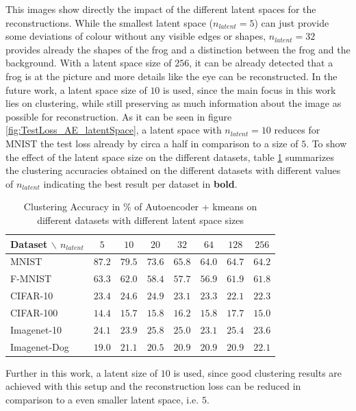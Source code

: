 \documentclass[12pt,DIV14,BCOR12mm,a4paper,footexclude,headinclude,halfparskip-,twoside,openright,cleardoubleempty,idxtotoc,bibtotoc,listtotoc]{scrreprt} %
\numberwithin{equation}{chapter}
\begin{document}
This images show directly the impact of the different latent spaces for the reconstructions. While the smallest latent space ($n_{latent}=5$) can just provide some deviations of colour without any visible edges or shapes, $n_{latent}=32$ provides already the shapes of the frog and a distinction between the frog and the background. With a latent space size of $256$, it can be already detected that a frog is at the picture and more details like the eye can be reconstructed.
In the future work, a latent space size of $10$ is used, since the main focus in this work lies on clustering, while still preserving as much information about the image as possible for reconstruction. As it can be seen in figure \ref{fig:TestLoss_AE_latentSpace}, a latent space with $n_{latent}=10$ reduces for MNIST the test loss already by circa a half in comparison to a size of $5$. To show the effect of the latent space size on the different datasets, table \ref{tab:ClusterACC_n_latent} summarizes the clustering accuracies obtained on the different datasets with different values of $n_{latent}$ indicating the best result per dataset in \textbf{bold}.
	\begin{table}[htb!]
    		\centering
    		\caption{Clustering Accuracy in \% of Autoencoder + kmeans on different datasets with different latent space sizes}
    		\label{tab:ClusterACC_n_latent}
    		\begin{tabular}{l|ccccccc}
        		Dataset $\backslash$ $n_{latent}$ & $5$ & $10$ & $20$ & $32$ & $64$ & $128$ & $256$\\ \hline
        		MNIST & $\mathbf{87.2}$ & $79.5$ & $73.6$ & $65.8$ & $64.0$ & $64.7$ & $64.2$\\
        		F-MNIST & $\mathbf{63.3}$ & $62.0$ & $58.4$ & $57.7$ & $56.9$ & $61.9$ & $61.8$\\
        		CIFAR-10 & $23.4$ & $24.6$ & $\mathbf{24.9}$ & $23.1$ & $23.3$ & $22.1$ & $22.3$\\
        		CIFAR-100 & $14.4$ & $15.7$ & $15.8$ & $\mathbf{16.2}$ & $15.8$ & $17.7$ & $15.0$\\
        		Imagenet-10 & $24.1$ & $23.9$ & $\mathbf{25.8}$ & $25.0$ & $23.1$ & $25.4$ & $23.6$\\
        		Imagenet-Dog & $19.0$ & $21.1$ & $20.5$ & $20.9$ & $20.9$ & $20.9$ & $\mathbf{22.1}$\\
    		\end{tabular}
	\end{table}
Further in this work, a latent size of $10$ is used, since good clustering results are achieved with this setup and the reconstruction loss can be reduced in comparison to a even smaller latent space, i.e. $5$.
\end{document}

